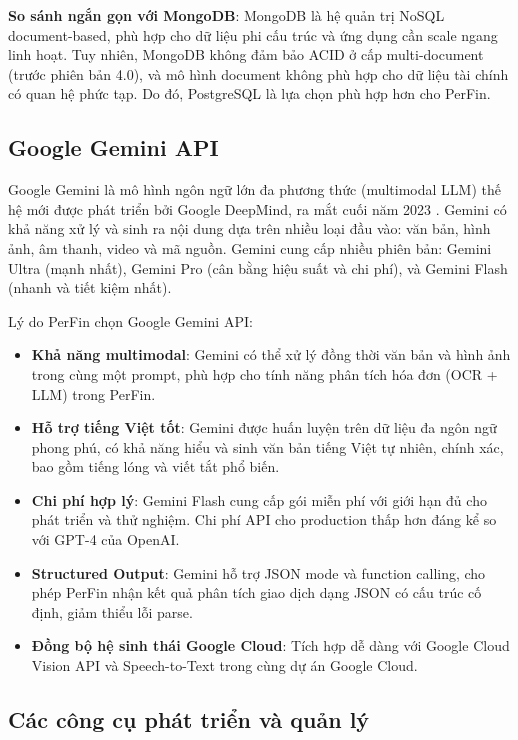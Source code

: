 \textbf{So sánh ngắn gọn với MongoDB}: MongoDB là hệ quản trị NoSQL document-based, phù hợp cho dữ liệu phi cấu trúc và ứng dụng cần scale ngang linh hoạt. Tuy nhiên, MongoDB không đảm bảo ACID ở cấp multi-document (trước phiên bản 4.0), và mô hình document không phù hợp cho dữ liệu tài chính có quan hệ phức tạp. Do đó, PostgreSQL là lựa chọn phù hợp hơn cho PerFin.

\subsection{Google Gemini API}
\label{subsec:gemini_api}

Google Gemini là mô hình ngôn ngữ lớn đa phương thức (multimodal LLM) thế hệ mới được phát triển bởi Google DeepMind, ra mắt cuối năm 2023 \cite{ref18}. Gemini có khả năng xử lý và sinh ra nội dung dựa trên nhiều loại đầu vào: văn bản, hình ảnh, âm thanh, video và mã nguồn. Gemini cung cấp nhiều phiên bản: Gemini Ultra (mạnh nhất), Gemini Pro (cân bằng hiệu suất và chi phí), và Gemini Flash (nhanh và tiết kiệm nhất).

Lý do PerFin chọn Google Gemini API:

\begin{itemize}
    \item \textbf{Khả năng multimodal}: Gemini có thể xử lý đồng thời văn bản và hình ảnh trong cùng một prompt, phù hợp cho tính năng phân tích hóa đơn (OCR + LLM) trong PerFin.
    \item \textbf{Hỗ trợ tiếng Việt tốt}: Gemini được huấn luyện trên dữ liệu đa ngôn ngữ phong phú, có khả năng hiểu và sinh văn bản tiếng Việt tự nhiên, chính xác, bao gồm tiếng lóng và viết tắt phổ biến.
    \item \textbf{Chi phí hợp lý}: Gemini Flash cung cấp gói miễn phí với giới hạn đủ cho phát triển và thử nghiệm. Chi phí API cho production thấp hơn đáng kể so với GPT-4 của OpenAI.
    \item \textbf{Structured Output}: Gemini hỗ trợ JSON mode và function calling, cho phép PerFin nhận kết quả phân tích giao dịch dạng JSON có cấu trúc cố định, giảm thiểu lỗi parse.
    \item \textbf{Đồng bộ hệ sinh thái Google Cloud}: Tích hợp dễ dàng với Google Cloud Vision API và Speech-to-Text trong cùng dự án Google Cloud.
\end{itemize}

\subsection{Các công cụ phát triển và quản lý}
\label{subsec:dev_tools}

